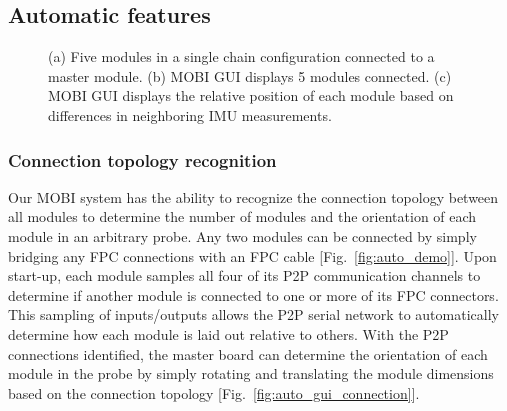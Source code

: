 \subsection{Automatic features}
\begin{figure}
    \begin{center}
    \end{center}
    \caption{(a) Five modules in a single chain configuration connected to a master module. (b) MOBI GUI displays 5 modules connected. (c) MOBI GUI displays the relative position of each module based on differences in neighboring IMU measurements.} 
    \label{fig:automatic}
\end{figure} 
\subsubsection{Connection topology recognition}
Our MOBI system has the ability to recognize the connection topology between all modules to determine the number of modules and the orientation of each module in an arbitrary probe. Any two modules can be connected by simply bridging any FPC connections with an FPC cable [Fig.~\ref{fig:auto_demo}]. Upon start-up, each module samples all four of its P2P communication channels to determine if another module is connected to one or more of its FPC connectors. This sampling of inputs/outputs allows the P2P serial network to automatically determine how each module is laid out relative to others. With the P2P connections identified, the master board can determine the orientation of each module in the probe by simply rotating and translating the module dimensions based on the connection topology [Fig.~\ref{fig:auto_gui_connection}]. 

